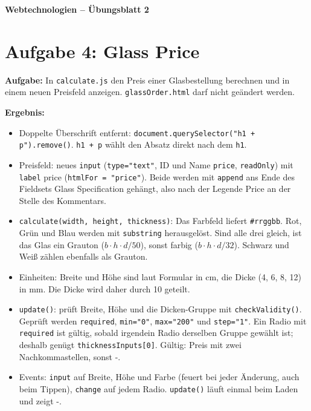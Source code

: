 \documentclass[11pt,a4paper]{article}
\begin{document}
\begin{center}
  {\Large\textbf{Webtechnologien -- Übungsblatt 2}}
\end{center}
\section*{Aufgabe 4: Glass Price}
\textbf{Aufgabe:} In \texttt{calculate.js} den Preis einer Glasbestellung
berechnen und in einem neuen Preisfeld anzeigen.
\texttt{glassOrder.html} darf nicht geändert werden.

\medskip
\textbf{Ergebnis:}
\begin{itemize}
  \item Doppelte Überschrift entfernt:
    \texttt{document.querySelector("h1 + p").remove()}.
    \texttt{h1 + p} wählt den Absatz direkt nach dem \texttt{h1}.
  \item Preisfeld: neues \texttt{input} (\texttt{type="text"}, ID und Name
    \texttt{price}, \texttt{readOnly}) mit \texttt{label} \glqq price\grqq{}
    (\texttt{htmlFor = "price"}). Beide werden mit \texttt{append} ans Ende
    des Fieldsets \glqq Glass Specification\grqq{} gehängt, also nach der
    Legende \glqq Price\grqq{} an der Stelle des Kommentars.
  \item \texttt{calculate(width, height, thickness)}: Das Farbfeld liefert
    \texttt{\#rrggbb}. Rot, Grün und Blau werden mit \texttt{substring}
    herausgelöst. Sind alle drei gleich, ist das Glas ein Grauton
    ($b \cdot h \cdot d / 50$), sonst farbig ($b \cdot h \cdot d / 32$).
    Schwarz und Weiß zählen ebenfalls als Grauton.
  \item Einheiten: Breite und Höhe sind laut Formular in cm, die Dicke
    (4, 6, 8, 12) in mm. Die Dicke wird daher durch 10 geteilt.
  \item \texttt{update()}: prüft Breite, Höhe und die Dicken-Gruppe mit
    \texttt{checkValidity()}. Geprüft werden \texttt{required},
    \texttt{min="0"}, \texttt{max="200"} und \texttt{step="1"}.
    Ein Radio mit \texttt{required} ist gültig, sobald irgendein Radio
    derselben Gruppe gewählt ist; deshalb genügt
    \texttt{thicknessInputs[0]}. Gültig: Preis mit zwei Nachkommastellen,
    sonst \glqq -\grqq.
  \item Events: \texttt{input} auf Breite, Höhe und Farbe (feuert bei jeder
    Änderung, auch beim Tippen), \texttt{change} auf jedem Radio.
    \texttt{update()} läuft einmal beim Laden und zeigt \glqq -\grqq.
\end{itemize}
\end{document}
